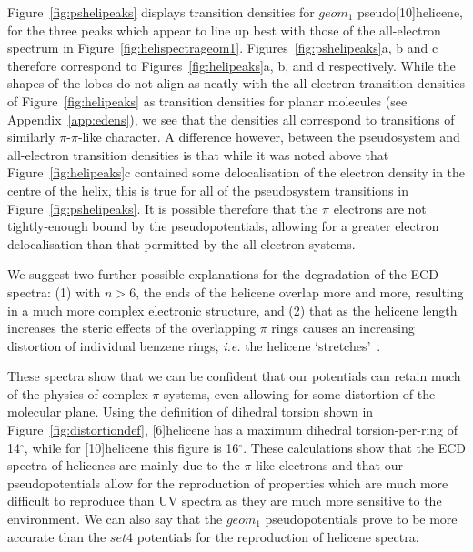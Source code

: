 \documentclass[aip,reprint,nofootinbib]{revtex4-1}
\begin{document}
Figure~\ref{fig:pshelipeaks} displays transition densities for $geom_1$ pseudo[10]helicene, for the three peaks which appear to line up best with those of the all-electron spectrum in Figure~\ref{fig:helispectrageom1}. Figures~\ref{fig:pshelipeaks}a, b and c therefore correspond to Figures~\ref{fig:helipeaks}a, b, and d respectively. While the shapes of the lobes do not align as neatly with the all-electron transition densities of Figure~\ref{fig:helipeaks} as transition densities for planar molecules (see Appendix~\ref{app:edens}), we see that the densities all correspond to transitions of similarly $\pi$-$\pi$-like character. A difference however, between the pseudosystem and all-electron transition densities is that while it was noted above that Figure~\ref{fig:helipeaks}c contained some delocalisation of the electron density in the centre of the helix, this is true for all of the pseudosystem transitions in Figure~\ref{fig:pshelipeaks}. It is possible therefore that the $\pi$ electrons are not tightly-enough bound by the pseudopotentials, allowing for a greater electron delocalisation than that permitted by the all-electron systems.

We suggest two further possible explanations for the degradation of the ECD spectra: (1) with $n > 6$, the ends of the helicene overlap more and more, resulting in a much more complex electronic structure, and (2) that as the helicene length increases the steric effects of the overlapping $\pi$ rings causes an increasing distortion of individual benzene rings, \emph{i.e.} the helicene `stretches'~\cite{rickhaus_2015}.

These spectra show that we can be confident that our potentials can retain much of the physics of complex $\pi$ systems, even allowing for some distortion of the molecular plane. Using the definition of dihedral torsion shown in Figure~\ref{fig:distortiondef}, [6]helicene has a maximum dihedral torsion-per-ring of 14$^{\circ}$, while for [10]helicene this figure is 16$^{\circ}$. These calculations show that the ECD spectra of helicenes are mainly due to the $\pi$-like electrons and that our pseudopotentials allow for the reproduction of properties which are much more difficult to reproduce than UV spectra as they are much more sensitive to the environment. We can also say that the $geom_1$ pseudopotentials prove to be more accurate than the $set4$ potentials for the reproduction of helicene spectra.
\end{document}
